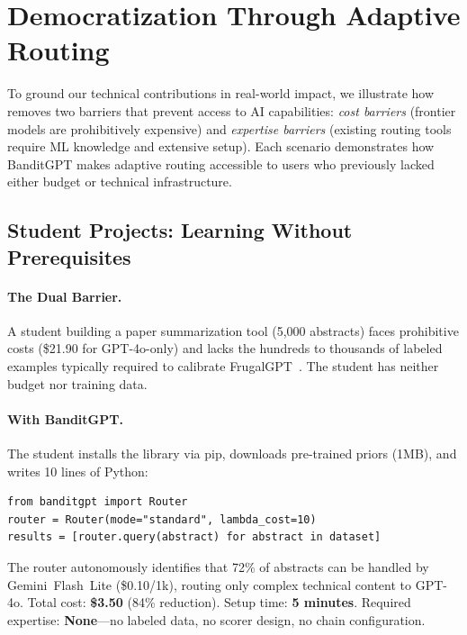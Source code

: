 
\section{Democratization Through Adaptive Routing}
\label{sec:use_cases}

To ground our technical contributions in real-world impact, we illustrate how \ours{} removes two barriers that prevent access to AI capabilities: \emph{cost barriers} (frontier models are prohibitively expensive) and \emph{expertise barriers} (existing routing tools require ML knowledge and extensive setup). Each scenario demonstrates how BanditGPT makes adaptive routing accessible to users who previously lacked either budget or technical infrastructure.

\subsection{Student Projects: Learning Without Prerequisites}

\paragraph{The Dual Barrier.} A student building a paper summarization tool (5,000 abstracts) faces prohibitive costs (\$21.90 for GPT-4o-only) and lacks the hundreds to thousands of labeled examples typically required to calibrate FrugalGPT~\cite{chen2023frugalgpt}. The student has neither budget nor training data.

\paragraph{With BanditGPT.} The student installs the library via pip, downloads pre-trained priors (1MB), and writes 10 lines of Python:

\begin{verbatim}
from banditgpt import Router
router = Router(mode="standard", lambda_cost=10)
results = [router.query(abstract) for abstract in dataset]
\end{verbatim}

The router autonomously identifies that 72\% of abstracts can be handled by Gemini~Flash~Lite (\$0.10/1k), routing only complex technical content to GPT-4o. Total cost: \textbf{\$3.50} (84\% reduction). Setup time: \textbf{5 minutes}. Required expertise: \textbf{None}---no labeled data, no scorer design, no chain configuration.


